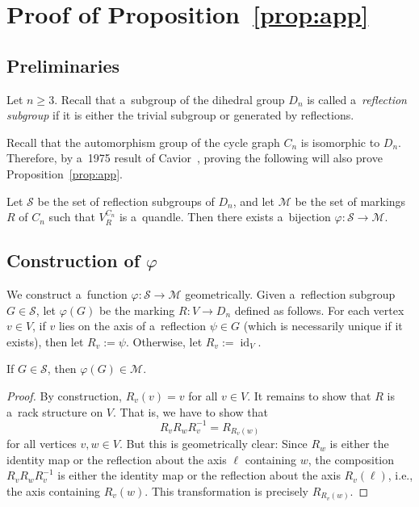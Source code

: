 \documentclass{jonasart}
\DeclareMathOperator{\id}{id}
\newcommand{\inv}{^{-1}}
\begin{document}
	\appendix

	\section{Proof of Proposition~\ref{prop:app}}\label{app:a}

	\subsection{Preliminaries}
	Let $n\geq 3$. Recall that a~subgroup of the dihedral group $D_n$ is called a~\emph{reflection subgroup} if it is either the trivial subgroup or generated by reflections.

	Recall that the automorphism group of the cycle graph $C_n$ is isomorphic to $D_n$. Therefore, by a~1975 result of Cavior~\cite{cavior}, proving the following will also prove Proposition~\ref{prop:app}.
    
	\begin{proposition}\label{prop:app1}
		Let $\mathcal{S}$ be the set of reflection subgroups of $D_n$, and let $\mathcal{M}$ be the set of markings $R$ of $C_n$ such that $V^{C_n}_R$ is a~quandle. Then there exists a~bijection $\varphi:\mathcal{S}\to\mathcal{M}$.
	\end{proposition}
	
    \subsection{Construction of $\varphi$}
	
    We construct a~function $\varphi:\mathcal{S}\to\mathcal{M}$ geometrically. Given a~reflection subgroup $G\in \mathcal{S}$, let $\varphi(G)$ be the marking $R:V\to D_n$ defined as follows. For each vertex $v\in V$, if $v$ lies on the axis of a~reflection $\psi\in G$ (which is necessarily unique if it exists), then let $R_v:=\psi$. Otherwise, let $R_v:=\id_V$.

	\begin{lemma}
		If $G\in \mathcal{S}$, then $\varphi(G)\in \mathcal{M}$.
	\end{lemma}

	\begin{proof}
		By construction, $R_v (v)=v$ for all $v\in V$. It remains to show that $R$ is a~rack structure on $V$. That is, we have to show that
		\[
			R_vR_wR_v\inv= R_{R_v(w)}
		\]
		for all vertices $v,w\in V$. But this is geometrically clear: Since $R_w$ is either the identity map or the reflection about the axis $\ell$ containing $w$, the composition $R_v R_w R_v\inv$ is either the identity map or the reflection about the axis $R_v (\ell)$, i.e., the axis containing $R_v (w)$. This transformation is precisely $R_{R_v (w)}$.
	\end{proof}
\end{document}
